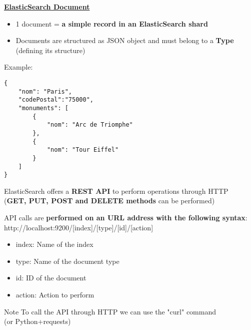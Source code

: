 \documentclass{beamer}[10pt, usepdftitle=false handout]
\begin{document}
\begin{frame}[fragile]

\underline{\textbf{ElasticSearch Document}}
\vspace*{0.6em}

\begin{itemize}
\item{1 document = \textbf{a simple record in an ElasticSearch shard}}
\item{Documents are structured as JSON object and must belong to a \textbf{Type} (defining its structure)}
\end{itemize}
\vspace*{0.6em}

Example:
\begin{verbatim}
{
    "nom": "Paris",
    "codePostal":"75000",
    "monuments": [
        {            
            "nom": "Arc de Triomphe"
        },
        {            
            "nom": "Tour Eiffel"
        }
    ]
}
\end{verbatim}


\end{frame}

\begin{frame}

ElasticSearch offers a \textbf{REST API} to perform operations through HTTP \\ (\textbf{GET, PUT, POST and DELETE methods} can be performed) 
\vspace*{0.6em}

API calls are \textbf{performed on an URL address with the following syntax}: \\
http://localhost:9200/[index]/[type]/[id]/[action]
\vspace*{0.6em}

\begin{itemize}
\item{index: Name of the index}
\item{type: Name of the document type}
\item{id: ID of the document}
\item{action: Action to perform}
\end{itemize}
\vspace*{0.6em}

\begin{block}{Note}
To call the API through HTTP we can use the "curl" command \\ (or Python+requests)
\end{block}

\end{frame}
\end{document}
